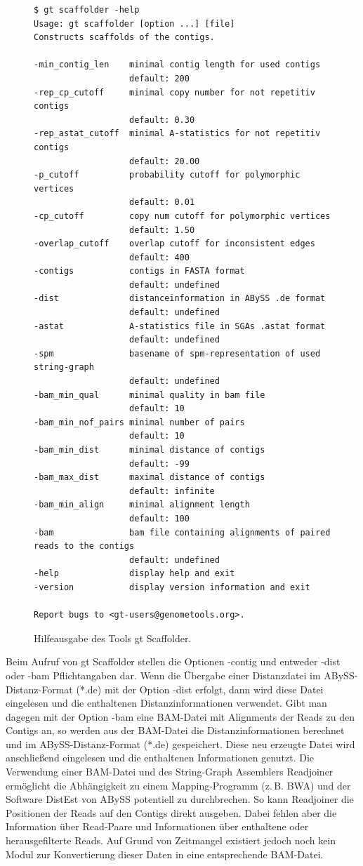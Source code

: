 \documentclass[a4paper,11pt,parskip]{scrartcl}
\begin{document}
\begin{figure}
\begin{verbatim}
$ gt scaffolder -help
Usage: gt scaffolder [option ...] [file]
Constructs scaffolds of the contigs.

-min_contig_len    minimal contig length for used contigs
                   default: 200
-rep_cp_cutoff     minimal copy number for not repetitiv contigs
                   default: 0.30
-rep_astat_cutoff  minimal A-statistics for not repetitiv contigs
                   default: 20.00
-p_cutoff          probability cutoff for polymorphic vertices
                   default: 0.01
-cp_cutoff         copy num cutoff for polymorphic vertices
                   default: 1.50
-overlap_cutoff    overlap cutoff for inconsistent edges
                   default: 400
-contigs           contigs in FASTA format
                   default: undefined
-dist              distanceinformation in ABySS .de format
                   default: undefined
-astat             A-statistics file in SGAs .astat format
                   default: undefined
-spm               basename of spm-representation of used string-graph
                   default: undefined
-bam_min_qual      minimal quality in bam file
                   default: 10
-bam_min_nof_pairs minimal number of pairs
                   default: 10
-bam_min_dist      minimal distance of contigs
                   default: -99
-bam_max_dist      maximal distance of contigs
                   default: infinite
-bam_min_align     minimal alignment length
                   default: 100
-bam               bam file containing alignments of paired reads to the contigs
                   default: undefined
-help              display help and exit
-version           display version information and exit

Report bugs to <gt-users@genometools.org>.
\end{verbatim}
\caption{\label{abb: help}Hilfeausgabe des Tools gt Scaffolder.}
\end{figure}

Beim Aufruf von gt Scaffolder stellen die Optionen -contig und
entweder -dist oder -bam Pflichtangaben dar. Wenn die Übergabe einer
Distanzdatei im ABySS-Distanz-Format (*.de) mit der Option -dist
erfolgt, dann wird diese Datei eingelesen und die enthaltenen
Distanzinformationen verwendet.  Gibt man dagegen mit der Option -bam
eine BAM-Datei mit Alignments der Reads zu den Contigs an, so werden
aus der BAM-Datei die Distanzinformationen berechnet und im
ABySS-Distanz-Format (*.de) gespeichert. Diese neu erzeugte Datei wird
anschließend eingelesen und die enthaltenen Informationen genutzt.
Die Verwendung einer BAM-Datei und des String-Graph Assemblers
Readjoiner ermöglicht die Abhängigkeit zu einem Mapping-Programm
(z.\,B. BWA) und der Software DistEst von ABySS potentiell zu
durchbrechen. So kann Readjoiner die Positionen der Reads auf den
Contigs direkt ausgeben. Dabei fehlen aber die Information über
Read-Paare und Informationen über enthaltene oder herausgefilterte
Reads. Auf Grund von Zeitmangel existiert jedoch noch kein Modul zur
Konvertierung dieser Daten in eine entsprechende BAM-Datei.
\end{document}
